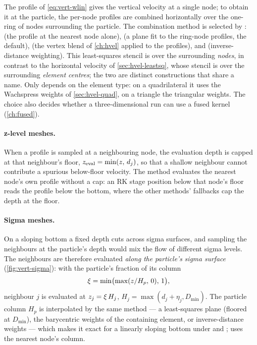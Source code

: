 The profile of \cref{eq:vert-wlin} gives the vertical velocity at a single node; to obtain it at the
particle, the per-node profiles are combined horizontally over the one-ring of nodes surrounding the
particle. The combination method is selected by :  (the profile at the
nearest node alone),  (a plane fit to the ring-node profiles, the default),
 (the vertex blend of \cref{ch:hvel} applied to the profiles), and 
(inverse-distance weighting). This least-squares stencil is over the surrounding \emph{nodes}, in
contrast to the horizontal velocity of \cref{sec:hvel-leastsq}, whose stencil is over the surrounding
\emph{element centres}; the two are distinct constructions that share a name. Only 
depends on the element type: on a quadrilateral it uses the Wachspress weights of
\cref{sec:hvel-quad}, on a triangle the triangular weights. The choice also decides whether a
three-dimensional run can use a fused kernel (\cref{ch:fused}).

\paragraph{z-level meshes.} When a profile is sampled at a neighbouring node, the evaluation depth is
capped at that neighbour's floor, $z_{\text{eval}}=\min(z,\,d_j)$, so that a shallow neighbour
cannot contribute a spurious below-floor velocity. The  method evaluates the nearest
node's own profile without a cap: an RK stage position below that node's floor reads the profile below
the bottom, where the other methods' fallbacks cap the depth at the floor.

\paragraph{Sigma meshes.} On a sloping bottom a fixed depth cuts across sigma surfaces, and sampling
the neighbours at the particle's depth would mix the flow of different sigma levels. The neighbours
are therefore evaluated \emph{along the particle's sigma surface} (\cref{fig:vert-sigma}): with the
particle's fraction of its column
\begin{equation}\label{eq:vert-sigma-frac}
  \xi = \min\bigl(\max(z/H_p,\,0),\,1\bigr),
\end{equation}
neighbour $j$ is evaluated at $z_j=\xi\,H_j$, $H_j=\max(d_j+\eta_j,D_{\min})$. The particle column
$H_p$ is interpolated by the same method --- a least-squares plane (floored at $D_{\min}$), the
barycentric weights of the containing element, or inverse-distance weights --- which makes it exact for
a linearly sloping bottom under  and ;  uses the nearest
node's column.

